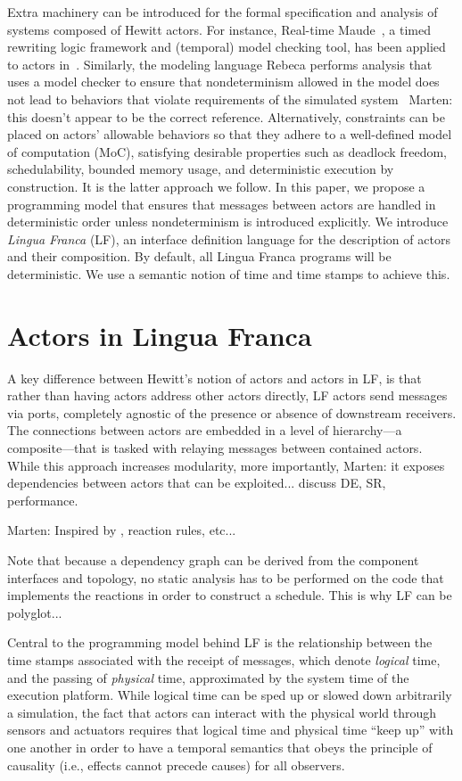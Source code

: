 \documentclass[sigconf]{acmart}
\newcommand{\marten}[1]{{\color{cyan} Marten: #1}}
\begin{document}
Extra machinery can be introduced for the formal specification and analysis of systems composed of Hewitt actors.
For instance, Real-time Maude~\cite{olveczky:2008:real}, a timed rewriting logic framework and (temporal) model checking tool, has been applied to actors in~\cite{Ding2003}. Similarly, the modeling language Rebeca performs analysis that uses a model checker to ensure that nondeterminism allowed in the model does not lead to behaviors that violate requirements of the simulated system~\cite{DBLP:conf/birthday/SirjaniJ11} \marten{this doesn't appear to be the correct reference}. Alternatively, constraints can be placed on actors' allowable behaviors so that they adhere to a well-defined model of computation (MoC), satisfying desirable properties such as deadlock freedom, schedulability, bounded memory usage, and deterministic execution by construction. It is the latter approach we follow. In this paper, we propose a programming model that ensures that messages between actors are handled in deterministic order unless nondeterminism is introduced explicitly. We introduce \emph{Lingua Franca} (LF), an interface definition language for the description of actors and their composition. By default, all Lingua Franca programs will be deterministic. We use a semantic notion of time and time stamps to achieve this.

\section{Actors in Lingua Franca}\label{sec:actor}
A key difference between Hewitt's notion of actors and actors in LF, is that rather than having actors address other actors directly, LF actors send messages via ports, completely agnostic of the presence or absence of downstream receivers. The connections between actors are embedded in a level of hierarchy---a composite---that is tasked with relaying messages between contained actors. While this approach increases modularity, more importantly, \marten{it exposes dependencies between actors that can be exploited...
discuss DE, SR, performance.}

\marten{Inspired by \cite{LeeMatsikoudis:09:Dataflow}, reaction rules, etc...

Note that because a dependency graph can be derived from the component interfaces and topology, no static analysis has to be performed on the code that implements the reactions in order to construct a schedule. This is why LF can be polyglot...}

Central to the programming model behind LF is the relationship between the time stamps associated with the receipt of messages, which denote \emph{logical} time, and the passing of \emph{physical} time, approximated by the system time of the execution platform. While logical time can be sped up or slowed down arbitrarily a simulation, the fact that actors can interact with the physical world through sensors and actuators requires that logical time and physical time ``keep up'' with one another in order to have a temporal semantics that obeys the principle of causality (i.e., effects cannot precede causes) for all observers. 
\end{document}
